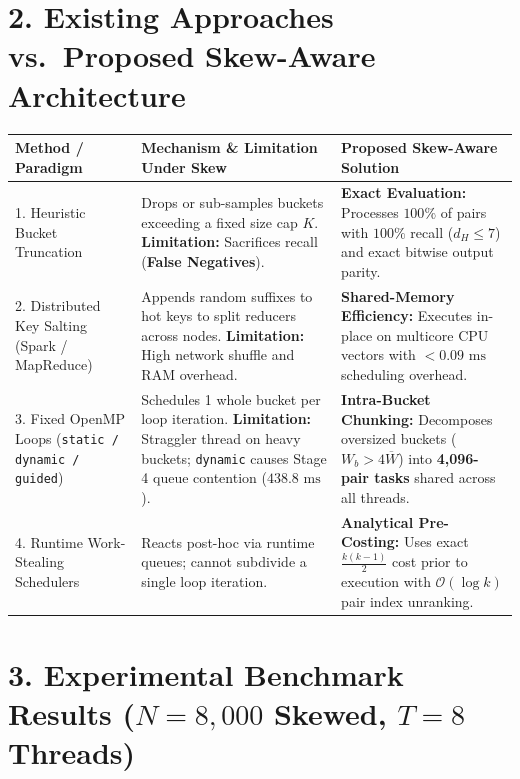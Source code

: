 \documentclass[10pt,a4paper]{article}
\renewcommand{\_}{\textunderscore\allowbreak}
\begin{document}
\section{2. Existing Approaches vs.\ Proposed Skew-Aware Architecture}

\begingroup
\footnotesize
\renewcommand{\arraystretch}{1.20}
\begin{tabular}{@{} B{0.23\textwidth} L{0.36\textwidth} L{0.36\textwidth} @{}}
    \toprule
    \textcolor{primaryblue}{Method / Paradigm} & \textcolor{dangerred}{\textbf{Mechanism \& Limitation Under Skew}} & \textcolor{successgreen}{\textbf{Proposed Skew-Aware Solution}} \\
    . Heuristic Bucket Truncation & Drops or sub-samples buckets exceeding a fixed size cap $K$. \textbf{Limitation:} Sacrifices recall (\textbf{False Negatives}). & \textbf{Exact Evaluation:} Processes $100\%$ of pairs with $100\%$ recall ($d_H \le 7$) and exact bitwise output parity. \\
    2. Distributed Key Salting (Spark / MapReduce) & Appends random suffixes to hot keys to split reducers across nodes. \textbf{Limitation:} High network shuffle and RAM overhead. & \textbf{Shared-Memory Efficiency:} Executes in-place on multicore CPU vectors with $<0.09\text{ ms}$ scheduling overhead. \\
    3. Fixed OpenMP Loops (\texttt{static / dynamic / guided}) & Schedules 1 whole bucket per loop iteration. \textbf{Limitation:} Straggler thread on heavy buckets; \texttt{dynamic} causes Stage 4 queue contention ($438.8\text{ ms}$). & \textbf{Intra-Bucket Chunking:} Decomposes oversized buckets ($W_b > 4\overline{W}$) into \textbf{4,096-pair tasks} shared across all threads. \\
    4. Runtime Work-Stealing Schedulers & Reacts post-hoc via runtime queues; cannot subdivide a single loop iteration. & \textbf{Analytical Pre-Costing:} Uses exact $\frac{k(k-1)}{2}$ cost prior to execution with $\mathcal{O}(\log k)$ pair index unranking. \\
    \bottomrule
\end{tabular}
\endgroup

\newpage

\section{3. Experimental Benchmark Results ($N = 8,000$ Skewed, $T = 8$ Threads)}
\end{document}
